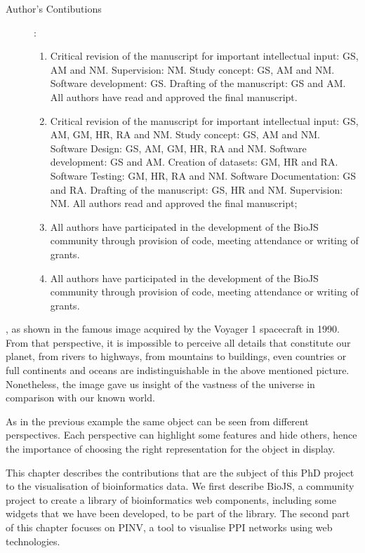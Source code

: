 \begin{description}
	\item[Author's Contibutions]:\\
		\begin{enumerate}
			\item Critical revision of the manuscript for important intellectual input: GS, AM and NM. Supervision: NM. Study concept: GS, AM and NM. Software development: GS. Drafting of the manuscript: GS and AM. All authors have read and approved the final manuscript.
			\item Critical revision of the manuscript for important intellectual input: GS, AM, GM, HR, RA and NM. Study concept: GS, AM and NM. Software Design: GS, AM, GM, HR, RA and NM. Software development: GS and AM. Creation of datasets: GM, HR and RA. Software Testing: GM, HR, RA and NM. Software Documentation: GS and RA. Drafting of the manuscript: GS, HR and NM. Supervision: NM. All authors read and approved the final manuscript;
			\item All authors have participated in the development of the BioJS community through provision of code, meeting attendance or writing of grants.
			\item All authors have participated in the development of the BioJS community through provision of code, meeting attendance or writing of grants.
		\end{enumerate}
\end{description}
\newpage
{}, as shown in the famous image acquired by the Voyager 1 spacecraft in 1990. From that perspective, it is impossible to perceive all details that constitute our planet, from rivers to highways, from mountains to buildings, even countries or full continents and oceans are indistinguishable in the above mentioned picture. Nonetheless, the image gave us insight of the vastness of the universe in comparison with our known world.

As in the previous example the same object can be seen from different perspectives. Each perspective can highlight some features and hide others, hence the importance of choosing the right representation for the object in display.

This chapter describes the contributions that are the subject of this PhD project to the visualisation of bioinformatics data. We first describe BioJS, a community project to create a library of bioinformatics web components, including some widgets that we have been developed, to be part of the library. The second part of this chapter focuses on PINV, a tool to visualise PPI networks using web technologies.


